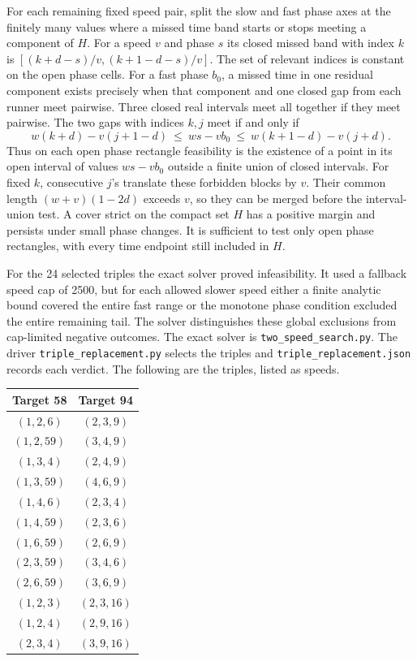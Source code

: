 \documentclass[11pt]{article}
\begin{document}
For each remaining fixed speed pair, split the slow and fast phase
axes at the finitely many values where a missed time band starts
or stops meeting a component of \(H\).
For a speed \(v\) and phase \(s\) its closed missed band with
index \(k\) is
\([(k+d-s)/v,(k+1-d-s)/v]\).
The set of relevant indices is constant on the open phase cells.
For a fast phase \(b_0\), a missed time in one residual component
exists precisely when that component and one closed gap from each
runner meet pairwise. Three closed real intervals meet all together
if they meet pairwise. The two gaps with indices \(k,j\) meet
if and only if
\[
 w(k+d)-v(j+1-d)\ \le\ ws-vb_0\ \le\
 w(k+1-d)-v(j+d).
\]
Thus on each open phase rectangle feasibility is the existence of
a point in its open interval of values \(ws-vb_0\) outside a finite
union of closed intervals. For fixed \(k\), consecutive \(j\)'s
translate these forbidden blocks by \(v\). Their common length
\((w+v)(1-2d)\) exceeds \(v\), so they can be merged before the
interval-union test. A cover strict on the compact set \(H\)
has a positive margin and persists under small phase changes.
It is sufficient to test only open phase rectangles, with every
time endpoint still included in \(H\).

For the 24 selected triples the exact solver proved infeasibility.
It used a fallback speed cap of 2500, but for each allowed slower
speed either a finite analytic bound covered the entire fast range
or the monotone phase condition excluded the entire remaining
tail. The solver distinguishes these global exclusions from
cap-limited negative outcomes. The exact solver is
\texttt{two\_speed\_search.py}. The driver \texttt{triple\_replacement.py}
selects the triples and \texttt{triple\_replacement.json} records
each verdict. The following are the triples, listed as speeds.
\begin{center}
\begin{tabular}{@{}cc@{}}
\toprule
Target 58 & Target 94 \\
\midrule
\((1,2,6)\)  & \((2,3,9)\) \\
\((1,2,59)\) & \((3,4,9)\) \\
\((1,3,4)\)  & \((2,4,9)\) \\
\((1,3,59)\) & \((4,6,9)\) \\
\((1,4,6)\)  & \((2,3,4)\) \\
\((1,4,59)\) & \((2,3,6)\) \\
\((1,6,59)\) & \((2,6,9)\) \\
\((2,3,59)\) & \((3,4,6)\) \\
\((2,6,59)\) & \((3,6,9)\) \\
\((1,2,3)\)  & \((2,3,16)\) \\
\((1,2,4)\)  & \((2,9,16)\) \\
\((2,3,4)\)  & \((3,9,16)\) \\
\bottomrule
\end{tabular}
\end{center}
\end{document}
